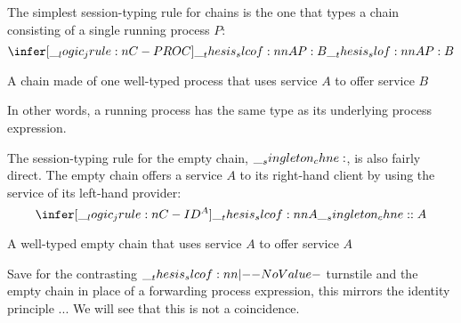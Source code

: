 The simplest session-typing rule for chains is the one that types a chain consisting of a single running process $P$:
\begin{equation*}
  \infer[\jrule{C-PROC}]{\slcof{A |- P : B}}{
    \slof{A |- P : B}}
\end{equation*}
%
\begin{marginfigure}[-3\baselineskip]
  \centering
  \caption{A chain made of one well-typed process that uses service $A$ to offer service $B$}\label{fig:singleton-processes:single-process-chain}
\end{marginfigure}%
%
In other words, a running process has the same type as its underlying process expression.


The session-typing rule for the empty chain, $\__singleton_chne:$, is also fairly direct.
The empty chain offers a service $A$ to its right-hand client by using the service of its left-hand provider:
\begin{equation*}
  \infer[\jrule{C-ID}\smash{^A}]{\slcof{A |- \chne : A}}{}
\end{equation*}
%
\begin{marginfigure}
  \centering
  \caption{A well-typed empty chain that uses service $A$ to offer service $A$}\label{fig:singleton-processes:empty-chain}
\end{marginfigure}%
%
Save for the contrasting $\slcof{|-}$ turnstile and the empty chain in place of a forwarding process expression, this mirrors the identity principle ...
We will see that this is not a coincidence.

